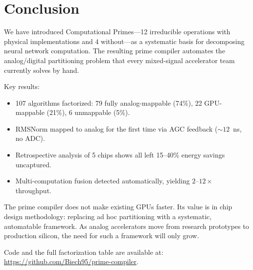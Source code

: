 \documentclass[11pt]{article}
\begin{document}
\section{Conclusion}

We have introduced Computational Primes---12 irreducible operations with physical implementations and 4 without---as a systematic basis for decomposing neural network computation. The resulting prime compiler automates the analog/digital partitioning problem that every mixed-signal accelerator team currently solves by hand.

Key results:
\begin{itemize}[leftmargin=*]
\item 107 algorithms factorized: 79 fully analog-mappable (74\%), 22 GPU-mappable (21\%), 6 unmappable (5\%).
\item RMSNorm mapped to analog for the first time via AGC feedback (${\sim}12$~ns, no ADC).
\item Retrospective analysis of 5 chips shows all left 15--40\% energy savings uncaptured.
\item Multi-computation fusion detected automatically, yielding $2$--$12\times$ throughput.
\end{itemize}

The prime compiler does not make existing GPUs faster. Its value is in chip design methodology: replacing ad hoc partitioning with a systematic, automatable framework. As analog accelerators move from research prototypes to production silicon, the need for such a framework will only grow.

Code and the full factorization table are available at: \url{https://github.com/Biech95/prime-compiler}.
\end{document}
